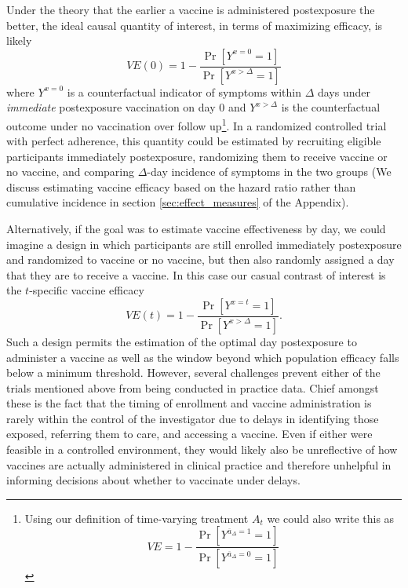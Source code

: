 \documentclass[11pt]{article}
\begin{document}
Under the theory that the earlier a vaccine is administered postexposure the better, the ideal causal quantity of interest, in terms of maximizing efficacy, is likely
$$VE(0) = 1 - \frac{\Pr[Y^{x = 0} = 1]}{\Pr[Y^{x > \Delta} = 1]}$$
where $Y^{x = 0}$ is a counterfactual indicator of symptoms within $\Delta$ days under \textit{immediate} postexposure vaccination on day 0 and $Y^{x > \Delta}$ is the counterfactual outcome under no vaccination over follow up\footnote{Using our definition of time-varying treatment $A_t$ we could also write this as $$VE = 1 - \frac{\Pr[Y^{\overline{a}_{\Delta} = 1} = 1]}{\Pr[Y^{\overline{a}_{\Delta} = 0} = 1]}$$}. In a randomized controlled trial with perfect adherence, this quantity could be estimated by recruiting eligible participants immediately postexposure, randomizing them to receive vaccine or no vaccine, and comparing $\Delta$-day incidence of symptoms in the two groups (We discuss estimating vaccine efficacy based on the hazard ratio rather than cumulative incidence in section \ref{sec:effect_measures} of the Appendix). 

Alternatively, if the goal was to estimate vaccine effectiveness by day, we could imagine a design in which participants are still enrolled immediately postexposure and randomized to vaccine or no vaccine, but then also randomly assigned a day that they are to receive a vaccine. In this case our casual contrast of interest is the $t$-specific vaccine efficacy
$$VE(t) = 1 - \frac{\Pr[Y^{x = t} = 1]}{\Pr[Y^{x > \Delta} = 1]}.$$
Such a design permits the estimation of the optimal day postexposure to administer a vaccine as well as the window beyond which population efficacy falls below a minimum threshold. However, several challenges prevent either of the trials mentioned above from being conducted in practice data. Chief amongst these is the fact that the timing of enrollment and vaccine administration is rarely within the control of the investigator due to delays in identifying those exposed, referring them to care, and accessing a vaccine. Even if either were feasible in a controlled environment, they would likely also be unreflective of how vaccines are actually administered in clinical practice and therefore unhelpful in informing decisions about whether to vaccinate under delays. 
\end{document}
